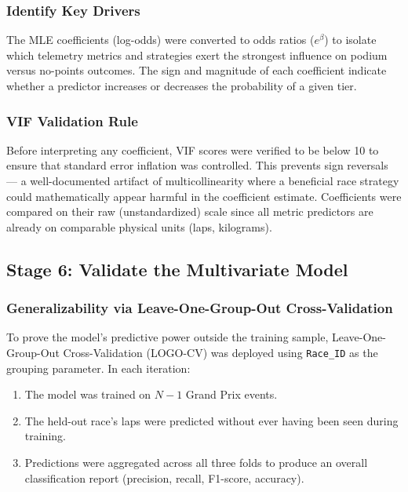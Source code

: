 \subsubsection{Identify Key Drivers}

The MLE coefficients (log-odds) were converted to odds ratios
($e^{\beta}$) to isolate which telemetry metrics and strategies exert the
strongest influence on podium versus no-points outcomes. The sign and
magnitude of each coefficient indicate whether a predictor increases or
decreases the probability of a given tier.

\subsubsection{VIF Validation Rule}

Before interpreting any coefficient, VIF scores were verified to be below
10 to ensure that standard error inflation was controlled. This prevents
sign reversals --- a well-documented artifact of multicollinearity where a
beneficial race strategy could mathematically appear harmful in the
coefficient estimate\parencite{tabachnick2019}. Coefficients were compared
on their raw (unstandardized) scale since all metric predictors are
already on comparable physical units (laps, kilograms).

\subsection{Stage 6: Validate the Multivariate Model}

\subsubsection{Generalizability via Leave-One-Group-Out Cross-Validation}

To prove the model's predictive power outside the training sample,
Leave-One-Group-Out Cross-Validation (LOGO-CV) was deployed using
\texttt{Race\_ID} as the grouping parameter. In each iteration:

\begin{enumerate}
  \item The model was trained on $N{-}1$ Grand Prix events.
  \item The held-out race's laps were predicted without ever having been
    seen during training.
  \item Predictions were aggregated across all three folds to produce an
    overall classification report (precision, recall, F1-score, accuracy).
\end{enumerate}

